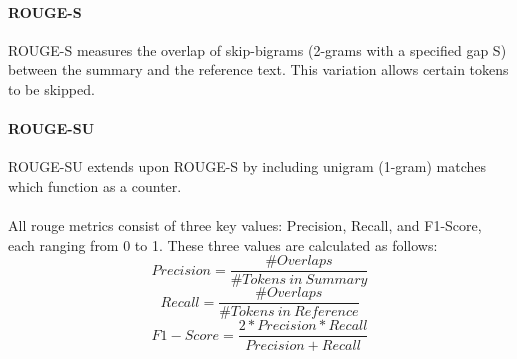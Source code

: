 \paragraph{ROUGE-S}
ROUGE-S measures the overlap of \glspl{skip-bigram} (2-grams with a specified gap S) between the summary and the reference text. This variation allows certain \glspl{token} to be skipped.
\paragraph{ROUGE-SU}
ROUGE-SU extends upon ROUGE-S by including unigram (1-gram) matches which function as a counter.\\
\\
All \gls{rouge} metrics consist of three key values: Precision, Recall, and F1-Score, each ranging from 0 to 1. These three values are calculated as follows:
\begin{equation}\label{eq:transformer_attention}
    Precision = \dfrac{\# Overlaps}{\# Tokens\ in\ Summary}
\end{equation}
\begin{equation}\label{eq:transformer_attention}
    Recall = \dfrac{\# Overlaps}{\# Tokens\ in\ Reference}
\end{equation}
\begin{equation}\label{eq:transformer_attention}
    F1-Score = \dfrac{2 * Precision * Recall}{Precision + Recall}
\end{equation}
